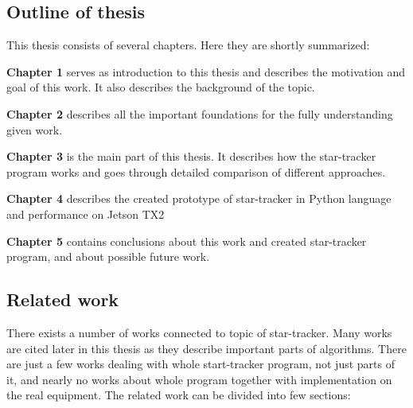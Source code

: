 \documentclass[12pt,a4paper,oneside]{article}
\begin{document}
\subsection{Outline of thesis}

This thesis consists of several chapters. Here they are shortly summarized:\par
\setlength{\parindent}{0cm}
\textbf{Chapter 1} serves as introduction to this thesis and describes the motivation and goal of this work. It also describes the background of the topic.\par
\textbf{Chapter 2} describes all the important foundations for the fully understanding given work.\par
\textbf{Chapter 3} is the main part of this thesis. It describes how the star-tracker program works and goes through detailed comparison of different approaches.\par
\textbf{Chapter 4} describes the created prototype of star-tracker in Python language and performance on Jetson TX2\par
\textbf{Chapter 5} contains conclusions about this work and created star-tracker program, and about possible future work.\par

\setlength{\parindent}{1cm}

\subsection{Related work}

There exists a number of works connected to topic of star-tracker. Many works are cited later in this thesis as they describe important parts of algorithms. There are just a few works dealing with whole start-tracker program, not just parts of it, and nearly no works about whole program together with implementation on the real equipment. The related work can be divided into few sections:
\end{document}

